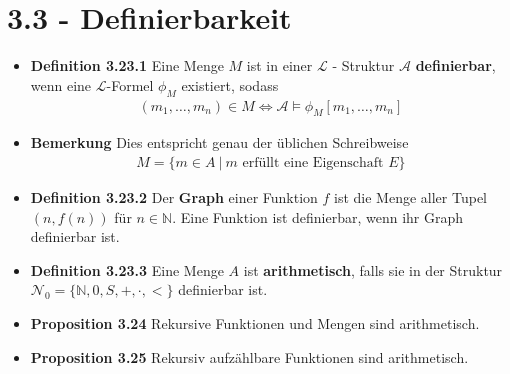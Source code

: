 \documentclass{scrartcl}
\renewcommand{\models}[0]{\vDash}
\begin{document}
\section*{3.3 - Definierbarkeit}
\begin{itemize}
    \item{\textbf{Definition 3.23.1}} Eine Menge $M$ ist in einer $\mathcal{L}$ - Struktur $\mathcal{A}$ \textbf{definierbar}, wenn eine $\mathcal{L}$-Formel $\phi_M$ existiert, sodass
    \begin{align*}
        (m_1, \hdots, m_n) \in M \Leftrightarrow \mathcal{A} \models \phi_M[m_1, \hdots, m_n]
    \end{align*}
    \item{\textbf{Bemerkung}} Dies entspricht genau der üblichen Schreibweise
    \begin{align*}
        M = \{m \in A \ |\ m \text{ erfüllt eine Eigenschaft } E\}  
    \end{align*}
    \item{\textbf{Definition 3.23.2}} Der \textbf{Graph} einer Funktion $f$ ist die Menge aller Tupel $(n, f(n))$ für $n \in \mathbb{N}$. Eine Funktion ist definierbar, wenn ihr Graph definierbar ist.
    \item{\textbf{Definition 3.23.3}} Eine Menge $A$ ist \textbf{arithmetisch}, falls sie in der Struktur $\mathcal{N}_0 = \{\mathbb{N},0,S,+,\cdot,<\}$ definierbar ist.
    \item{\textbf{Proposition 3.24}} Rekursive Funktionen und Mengen sind arithmetisch.
    \item{\textbf{Proposition 3.25}} Rekursiv aufzählbare Funktionen sind arithmetisch.
\end{itemize}
\end{document}
